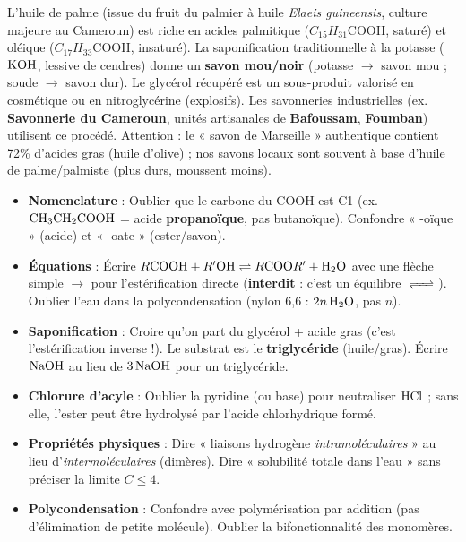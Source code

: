 \documentclass[11pt]{article}
\begin{document}
\begin{savaistu}
L'huile de palme (issue du fruit du palmier à huile \emph{Elaeis guineensis}, culture majeure au Cameroun) est riche en acides palmitique ($C_{15}H_{31}\mathrm{COOH}$, saturé) et oléique ($C_{17}H_{33}\mathrm{COOH}$, insaturé). La saponification traditionnelle à la potasse ($\ce{KOH}$, lessive de cendres) donne un \textbf{savon mou/noir} (potasse $\rightarrow$ savon mou ; soude $\rightarrow$ savon dur). Le glycérol récupéré est un sous-produit valorisé en cosmétique ou en nitroglycérine (explosifs). Les savonneries industrielles (ex. \textbf{Savonnerie du Cameroun}, unités artisanales de \textbf{Bafoussam}, \textbf{Foumban}) utilisent ce procédé. Attention : le « savon de Marseille » authentique contient 72\% d'acides gras (huile d'olive) ; nos savons locaux sont souvent à base d'huile de palme/palmiste (plus durs, moussent moins).
\end{savaistu}

\begin{attention}
\begin{itemize}
  \item \textbf{Nomenclature} : Oublier que le carbone du $\mathrm{COOH}$ est C1 (ex. $\ce{CH3CH2COOH}$ = acide \textbf{propanoïque}, pas butanoïque). Confondre « -oïque » (acide) et « -oate » (ester/savon).
  \item \textbf{Équations} : Écrire $R\mathrm{COOH} + R'\mathrm{OH} \rightleftharpoons R\mathrm{COO}R' + \ce{H2O}$ avec une flèche simple $\rightarrow$ pour l'estérification directe (\textbf{interdit} : c'est un équilibre $\ce{<=>}$). Oublier l'eau dans la polycondensation (nylon 6,6 : $2n\,\ce{H2O}$, pas $n$).
  \item \textbf{Saponification} : Croire qu'on part du glycérol + acide gras (c'est l'estérification inverse !). Le substrat est le \textbf{triglycéride} (huile/gras). Écrire $\ce{NaOH}$ au lieu de $3\,\ce{NaOH}$ pour un triglycéride.
  \item \textbf{Chlorure d'acyle} : Oublier la pyridine (ou base) pour neutraliser $\ce{HCl}$ ; sans elle, l'ester peut être hydrolysé par l'acide chlorhydrique formé.
  \item \textbf{Propriétés physiques} : Dire « liaisons hydrogène \emph{intramoléculaires} » au lieu d'\emph{intermoléculaires} (dimères). Dire « solubilité totale dans l'eau » sans préciser la limite $C \le 4$.
  \item \textbf{Polycondensation} : Confondre avec polymérisation par addition (pas d'élimination de petite molécule). Oublier la bifonctionnalité des monomères.
\end{itemize}
\end{attention}
\end{document}
